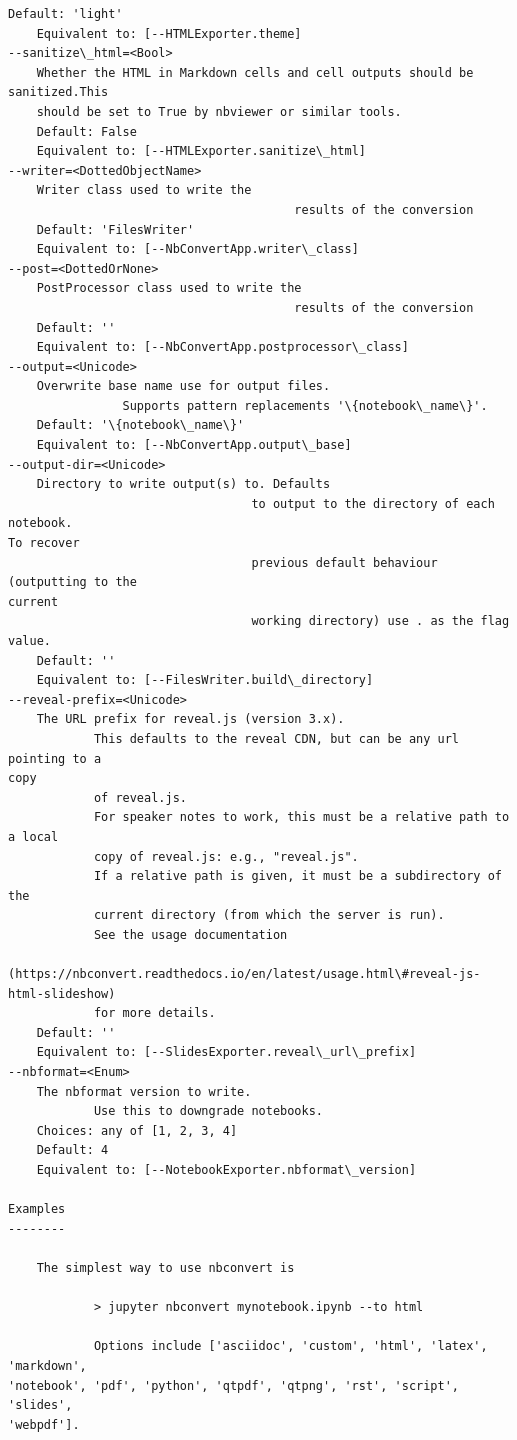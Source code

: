 \documentclass[11pt]{article}
\begin{document}
\begin{Verbatim}[commandchars=\\\{\}]
    Default: 'light'
    Equivalent to: [--HTMLExporter.theme]
--sanitize\_html=<Bool>
    Whether the HTML in Markdown cells and cell outputs should be sanitized.This
    should be set to True by nbviewer or similar tools.
    Default: False
    Equivalent to: [--HTMLExporter.sanitize\_html]
--writer=<DottedObjectName>
    Writer class used to write the
                                        results of the conversion
    Default: 'FilesWriter'
    Equivalent to: [--NbConvertApp.writer\_class]
--post=<DottedOrNone>
    PostProcessor class used to write the
                                        results of the conversion
    Default: ''
    Equivalent to: [--NbConvertApp.postprocessor\_class]
--output=<Unicode>
    Overwrite base name use for output files.
                Supports pattern replacements '\{notebook\_name\}'.
    Default: '\{notebook\_name\}'
    Equivalent to: [--NbConvertApp.output\_base]
--output-dir=<Unicode>
    Directory to write output(s) to. Defaults
                                  to output to the directory of each notebook.
To recover
                                  previous default behaviour (outputting to the
current
                                  working directory) use . as the flag value.
    Default: ''
    Equivalent to: [--FilesWriter.build\_directory]
--reveal-prefix=<Unicode>
    The URL prefix for reveal.js (version 3.x).
            This defaults to the reveal CDN, but can be any url pointing to a
copy
            of reveal.js.
            For speaker notes to work, this must be a relative path to a local
            copy of reveal.js: e.g., "reveal.js".
            If a relative path is given, it must be a subdirectory of the
            current directory (from which the server is run).
            See the usage documentation
            (https://nbconvert.readthedocs.io/en/latest/usage.html\#reveal-js-
html-slideshow)
            for more details.
    Default: ''
    Equivalent to: [--SlidesExporter.reveal\_url\_prefix]
--nbformat=<Enum>
    The nbformat version to write.
            Use this to downgrade notebooks.
    Choices: any of [1, 2, 3, 4]
    Default: 4
    Equivalent to: [--NotebookExporter.nbformat\_version]

Examples
--------

    The simplest way to use nbconvert is

            > jupyter nbconvert mynotebook.ipynb --to html

            Options include ['asciidoc', 'custom', 'html', 'latex', 'markdown',
'notebook', 'pdf', 'python', 'qtpdf', 'qtpng', 'rst', 'script', 'slides',
'webpdf'].


\end{Verbatim}
\end{document}

